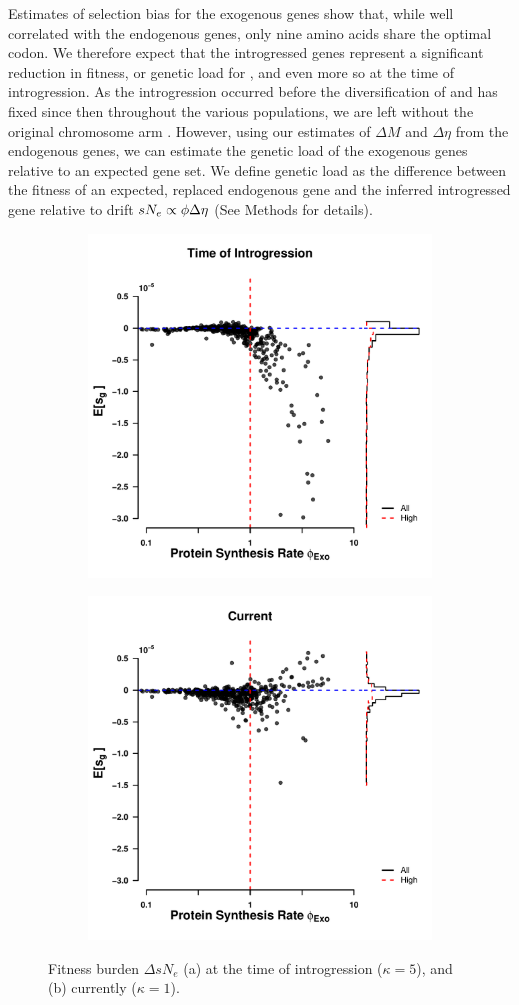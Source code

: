\documentclass[12pt]{article}
\begin{document}
Estimates of selection bias for the exogenous genes show that, while well correlated with the endogenous genes, only nine amino acids share the optimal codon.
We therefore expect that the introgressed genes represent a significant reduction in fitness, or genetic load for \kluyveri, and even more so at the time of introgression.
As the introgression occurred before the diversification of \kluyveri and has fixed since then throughout the various populations, we are left without the original chromosome arm \citep{friedrich2015}.
However, using our estimates of $\Delta M$ and $\Delta \eta$ from the endogenous genes, we can estimate the genetic load of the exogenous genes relative to an expected gene set.
We define genetic load as the difference between the fitness of an expected, replaced endogenous gene and the inferred introgressed gene relative to drift $sN_e \propto \phi {\Delta \eta}$ (See Methods for details).
\begin{figure}[h]
    \centering
    \begin{subfigure}
        \centering
        \includegraphics[width=.45\textwidth]{img/fitness_difference_gos_kappa5.pdf}
    \end{subfigure}
    \begin{subfigure}
        \centering
        \includegraphics[width=.45\textwidth]{img/fitness_difference_exo.pdf}
    \end{subfigure}
    \caption{Fitness burden $\Delta sN_e$ (a) at the time of introgression ($\kappa = 5$), and (b) currently ($\kappa = 1$). }
    \label{fig:sne_fitness_burden}
\end{figure}
\end{document}
